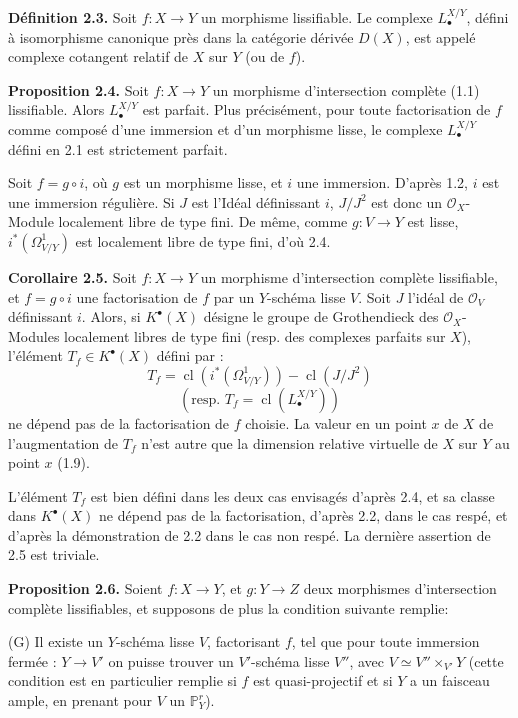 \documentclass[11pt]{article}
\begin{document}
\textbf{Définition 2.3.} Soit $f:X\to Y$ un morphisme lissifiable. Le complexe $L^{X/Y}_\bullet$, défini à isomorphisme canonique près dans la catégorie dérivée $D(X)$, est appelé complexe cotangent relatif de $X$ sur $Y$ (ou de $f$).

\textbf{Proposition 2.4.} Soit $f:X\to Y$ un morphisme d'intersection complète (1.1) lissifiable. Alors $L^{X/Y}_\bullet$ est parfait. Plus précisément, pour toute
factorisation de $f$ comme composé d'une immersion et d'un morphisme lisse, le complexe $L^{X/Y}_\bullet$ défini en 2.1 est strictement parfait.

Soit $f=g\circ i$, où $g$ est un morphisme lisse, et $i$ une immersion. D'après 1.2, $i$ est une immersion régulière. Si $J$ est l'Idéal définissant $i$, $J/J^2$ est donc un $\mathcal O_X$-Module localement libre de type fini. De même, comme $g:V\to Y$ est lisse, $i^*(\Omega^1_{V/Y})$ est localement libre de type fini, d'où 2.4.

\textbf{Corollaire 2.5.} Soit $f:X\to Y$ un morphisme d'intersection complète lissifiable, et $f=g\circ i$ une factorisation de $f$ par un $Y$-schéma lisse $V$. Soit $J$ l'idéal de $\mathcal O_V$ définissant $i$. Alors, si $K^{\bullet}(X)$ désigne le groupe de Grothendieck des $\mathcal O_X$-Modules localement libres de type fini (resp. des complexes parfaits sur $X$), l'élément $T_f\in K^{\bullet}(X)$ défini par :
\[
T_f=\operatorname{cl}(i^*(\Omega^1_{V/Y}))-\operatorname{cl}(J/J^2)
\]
\[
(\text{resp. }T_f=\operatorname{cl}(L^{X/Y}_\bullet))
\]
ne dépend pas de la factorisation de $f$ choisie. La valeur en un point $x$ de $X$ de l'augmentation de $T_f$ n'est autre que la dimension relative virtuelle de $X$ sur $Y$ au point $x$ (1.9).

L'élément $T_f$ est bien défini dans les deux cas envisagés d'après 2.4, et sa classe dans $K^{\bullet}(X)$ ne dépend pas de la factorisation, d'après 2.2, dans le cas respé, et d'après la démonstration de 2.2 dans le cas non respé. La dernière assertion de 2.5 est triviale.

\textbf{Proposition 2.6.} Soient $f:X\to Y$, et $g:Y\to Z$ deux morphismes d'intersection complète lissifiables, et supposons de plus la condition suivante remplie:

(G) Il
existe un $Y$-schéma lisse $V$, factorisant $f$, tel que pour toute immersion fermée : $Y\to V'$ on puisse trouver un $V'$-schéma lisse $V''$, avec $V\simeq V''\times_{V'}Y$ (cette condition est en particulier remplie si $f$ est quasi-projectif et si $Y$ a un faisceau ample, en prenant pour $V$ un $\mathbb P^r_Y$).
\end{document}
